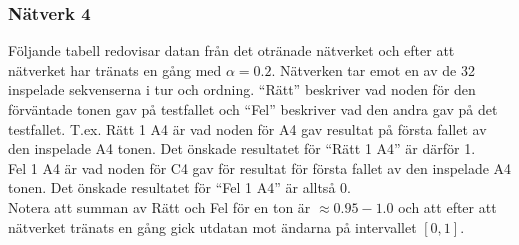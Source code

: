 \documentclass[a4paper,10pt]{article}
\begin{document}


\subsubsection{Nätverk 4}

Följande tabell redovisar datan från det otränade nätverket och efter att nätverket har tränats en gång med $\alpha=0.2$. Nätverken tar emot en av de 32 inspelade sekvenserna i tur och ordning. ``Rätt'' beskriver vad noden för den förväntade tonen gav på testfallet och ``Fel'' beskriver vad den andra gav på det testfallet. T.ex. Rätt 1 A4 är vad noden för A4 gav resultat på första fallet av den inspelade A4 tonen. Det önskade resultatet för ``Rätt 1 A4'' är därför 1. \\
Fel 1 A4 är vad noden för C4 gav för resultat för första fallet av den inspelade A4 tonen. Det önskade resultatet för ``Fel 1 A4'' är alltså 0.\\
Notera att summan av Rätt och Fel för en ton är $\approx 0.95-1.0$ och att efter att nätverket tränats en gång gick utdatan mot ändarna på intervallet $[0,1]$.\\
\end{document}
